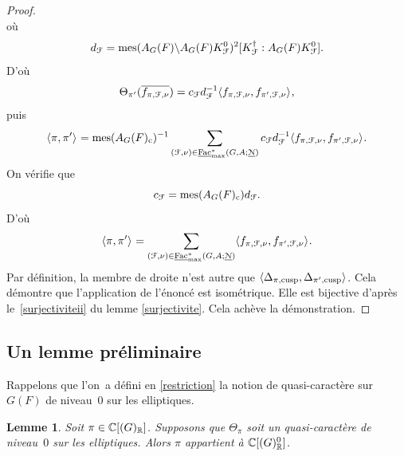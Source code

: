 \documentclass[11pt]{article}
\numberwithin{equation}{section}\providecommand{\og}{«\,}\providecommand{\fg}{\,»}
\let\mathcal \EuScript
\newcommand{\NoChangel}[1]{%
\expandafter\let\csname old\string#1\endcsname=#1
\let#1=\relax
\newcommand{#1}{\mathcode`l="716C\csname old\string#1\endcsname\mathcode`l="7160 }%
}
\let\<\langle
\let\>\rangle
\newcommand{\rc}{\mathrm{c}}
\newcommand{\cusp}{\mathrm{cusp}}
\newcommand{\rell}{\mathrm{ell}} \NoChangel{\rell}
\newcommand{\Ell}{\mathrm{Ell}} \NoChangel{\Ell}
\newcommand{\Fac}{\mathrm{Fac}}
\DeclareMathOperator{\mes}{mes}
\newcommand{\cF}{\mathcal{F}}
\newcommand{\cN}{\mathcal{N}}
\newcommand{\CC}{\mathbb{C}}
\newcommand{\RR}{\mathbb{R}}
\theoremstyle{plain}
\newtheorem*{lem*}{Lemme}
\theoremstyle{definition}
\begin{document}
\begin{proof}
\[\]
où
\[
d_{\cF}=\mes(A_{G}(F)\backslash A_{G}(F)K_{\cF}^0)^2[K_{\cF}^{\dag}:A_{G}(F)K_{\cF}^0].
\]
D'où
\[
\Theta_{\pi'}(\overline{f_{\pi,\cF,\nu}})= c_{\cF}d_{\cF}^{-1}\<f_{\pi,\cF,\nu},f_{\pi',\cF,\nu}\>_{\rell},
\]
puis
\[
\<\pi,\pi'\>_{\rell}=\mes(A_{G}(F)_{\rc})^{-1}\sum_{(\cF,\nu)\in \underline{\Fac}^*_{\max}(G,A;\underline{\cN})} c_{\cF}d_{\cF}^{-1}\<f_{\pi,\cF,\nu},f_{\pi',\cF,\nu}\>_{\rell}.
\]
On vérifie que
\[
c_{\cF}=\mes(A_{G}(F)_{\rc}) d_{\cF}.
\]
D'où
\[
\<\pi,\pi'\>_{\rell}=\sum_{(\cF,\nu)\in \underline{\Fac}^*_{\max}(G,A;\underline{\cN})}\<f_{\pi,\cF,\nu},f_{\pi',\cF,\nu}\>_{\rell}.
\]
Par définition, la membre de droite n'est autre que $\<\Delta_{\pi,\cusp},\Delta_{\pi',\cusp}\>_{\rell}$. Cela démontre que l'application de l'énoncé est isométrique. Elle est bijective d'après le~\eqref{surjectiviteii} du lemme \ref{surjectivite}. Cela achève la démonstration.
\end{proof}

\subsection{Un lemme préliminaire}\label{unlemme}

Rappelons que l'on~a défini en \ref{restriction} la notion de quasi-caractère sur $G(F)$ de niveau~$0$ sur les elliptiques.

\begin{lem*}
Soit $\pi\in \CC[\Ell(G)_{\RR}]$. Supposons que $\Theta_{\pi}$ soit un quasi-caractère de niveau~$0$ sur les elliptiques. Alors $\pi$ appartient à $\CC[\Ell(G)^0_{\RR}]$.
\end{lem*}
\end{document}
